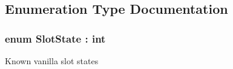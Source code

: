 \subsection{Enumeration Type Documentation}
\hypertarget{namespaceOTA_1_1Sockets_a74279593a3ea6456730e42aa2299a916}{}
\subsubsection[{Slot\+State}]{\setlength{\rightskip}{0pt plus 5cm}enum {\bf Slot\+State} \+: int\hspace{0.3cm}{\ttfamily [strong]}}\label{namespaceOTA_1_1Sockets_a74279593a3ea6456730e42aa2299a916}


Known vanilla slot states 

